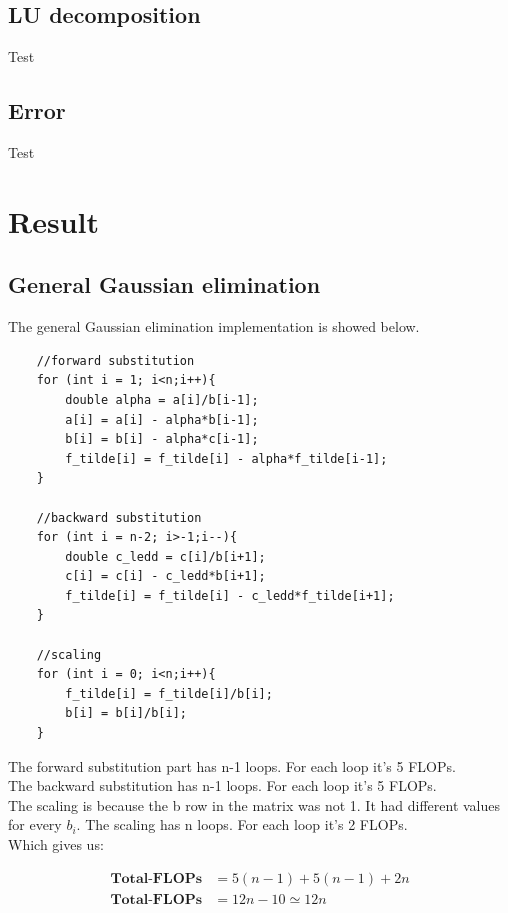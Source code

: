 \documentclass[12pt,norsk,a4paper]{article}
\begin{document}
\subsection{LU decomposition}
Test


\subsection{Error}
Test

















\section{Result}


\subsection{General Gaussian elimination}
The general Gaussian elimination implementation is showed below. 

\begin{lstlisting}
    //forward substitution
    for (int i = 1; i<n;i++){
        double alpha = a[i]/b[i-1];
        a[i] = a[i] - alpha*b[i-1];
        b[i] = b[i] - alpha*c[i-1];
        f_tilde[i] = f_tilde[i] - alpha*f_tilde[i-1];
    }

    //backward substitution
    for (int i = n-2; i>-1;i--){
        double c_ledd = c[i]/b[i+1];
        c[i] = c[i] - c_ledd*b[i+1];
        f_tilde[i] = f_tilde[i] - c_ledd*f_tilde[i+1];
    }

    //scaling
    for (int i = 0; i<n;i++){
        f_tilde[i] = f_tilde[i]/b[i];
        b[i] = b[i]/b[i];
    }
\end{lstlisting}

The forward substitution part has n-1 loops. For each loop it's 5 FLOPs. \\
The backward substitution has n-1 loops. For each loop it's 5 FLOPs. \\
The scaling is because the b row in the matrix was not 1. It had different values for every $b_i$. The scaling has n loops. For each loop it's 2 FLOPs. \\
Which gives us: 

\begin{align*}
\textbf{Total-FLOPs} &= 5(n-1) + 5(n-1) + 2n
\\ 
\textbf{Total-FLOPs} &= 12n - 10 \simeq 12n
\end{align*}
\end{document}
